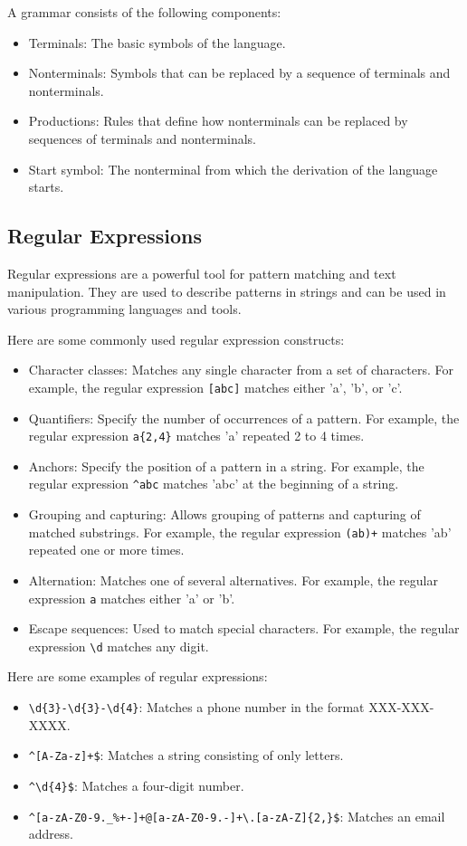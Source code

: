 \documentclass[letterpaper,12pt]{article}
\begin{document}
A grammar consists of the following components:
\begin{itemize}
      \item Terminals: The basic symbols of the language.
      \item Nonterminals: Symbols that can be replaced by a sequence of terminals and nonterminals.
      \item Productions: Rules that define how nonterminals can be replaced by sequences of terminals and nonterminals.
      \item Start symbol: The nonterminal from which the derivation of the language starts.
\end{itemize}

\subsection{Regular Expressions}
Regular expressions are a powerful tool for pattern matching and text manipulation. They are used to describe patterns in strings and can be used in various programming languages and tools.

Here are some commonly used regular expression constructs:
\begin{itemize}
      \item Character classes: Matches any single character from a set of characters. For example, the regular expression \verb|[abc]| matches either 'a', 'b', or 'c'.
      \item Quantifiers: Specify the number of occurrences of a pattern. For example, the regular expression \verb|a{2,4}| matches 'a' repeated 2 to 4 times.
      \item Anchors: Specify the position of a pattern in a string. For example, the regular expression \verb|^abc| matches 'abc' at the beginning of a string.
      \item Grouping and capturing: Allows grouping of patterns and capturing of matched substrings. For example, the regular expression \verb|(ab)+| matches 'ab' repeated one or more times.
      \item Alternation: Matches one of several alternatives. For example, the regular expression \verb|a| matches either 'a' or 'b'.
      \item Escape sequences: Used to match special characters. For example, the regular expression \verb|\d| matches any digit.
\end{itemize}

Here are some examples of regular expressions:
\begin{itemize}
      \item \verb|\d{3}-\d{3}-\d{4}|: Matches a phone number in the format XXX-XXX-XXXX.
      \item \verb|^[A-Za-z]+$|: Matches a string consisting of only letters.
      \item \verb|^\d{4}$|: Matches a four-digit number.
      \item \verb|^[a-zA-Z0-9._%+-]+@[a-zA-Z0-9.-]+\.[a-zA-Z]{2,}$|: Matches an email address.
\end{itemize}
\end{document}
